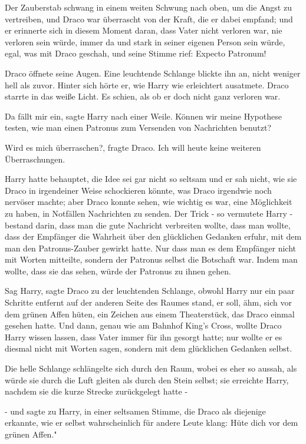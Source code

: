 Der Zauberstab schwang in einem weiten Schwung nach oben, um die Angst zu
vertreiben, und Draco war überrascht von der Kraft, die er dabei empfand; und er
erinnerte sich in diesem Moment daran, dass Vater nicht verloren war, nie
verloren sein würde, immer da und stark in seiner eigenen Person sein würde,
egal, was mit Draco geschah, und seine Stimme rief: \glqq Expecto Patronum!

Draco öffnete seine Augen. Eine leuchtende Schlange blickte ihn an, nicht
weniger hell als zuvor. Hinter sich hörte er, wie Harry wie erleichtert
ausatmete. Draco starrte in das weiße Licht. Es schien, als ob er doch nicht
ganz verloren war.

\glqq Da fällt mir ein\grqq{}, sagte Harry nach einer Weile. \glqq Können wir
meine Hypothese testen, wie man einen Patronus zum Versenden von Nachrichten
benutzt?\grqq{}

\glqq Wird es mich überraschen?\grqq{}, fragte Draco. \glqq Ich will heute keine
weiteren Überraschungen.\grqq{}

Harry hatte behauptet, die Idee sei gar nicht so seltsam und er sah nicht, wie
sie Draco in irgendeiner Weise schockieren könnte, was Draco irgendwie noch
nervöser machte; aber Draco konnte sehen, wie wichtig es war, eine Möglichkeit
zu haben, in Notfällen Nachrichten zu senden. Der Trick - so vermutete Harry -
bestand darin, dass man die gute Nachricht verbreiten wollte, dass man wollte,
dass der Empfänger die Wahrheit über den glücklichen Gedanken erfuhr, mit dem
man den Patronus-Zauber gewirkt hatte. Nur dass man es dem Empfänger nicht mit
Worten mitteilte, sondern der Patronus selbst die Botschaft war. Indem man
wollte, dass sie das sehen, würde der Patronus zu ihnen gehen. \glqq

Sag Harry\grqq{}, sagte Draco zu der leuchtenden Schlange, obwohl Harry nur ein
paar Schritte entfernt auf der anderen Seite des Raumes stand, \glqq er soll,
ähm, sich vor dem grünen Affen hüten\grqq{}, ein Zeichen aus einem Theaterstück,
das Draco einmal gesehen hatte. Und dann, genau wie am Bahnhof King's Cross,
wollte Draco Harry wissen lassen, dass Vater immer für ihn gesorgt hatte; nur
wollte er es diesmal nicht mit Worten sagen, sondern mit dem glücklichen
Gedanken selbst.

Die helle Schlange schlängelte sich durch den Raum, wobei es eher so aussah, als
würde sie durch die Luft gleiten als durch den Stein selbst; sie erreichte
Harry, nachdem sie die kurze Strecke zurückgelegt hatte -

- und sagte zu Harry, in einer seltsamen Stimme, die Draco als diejenige
erkannte, wie er selbst wahrscheinlich für andere Leute klang: \glqq Hüte dich
vor dem grünen Affen."

